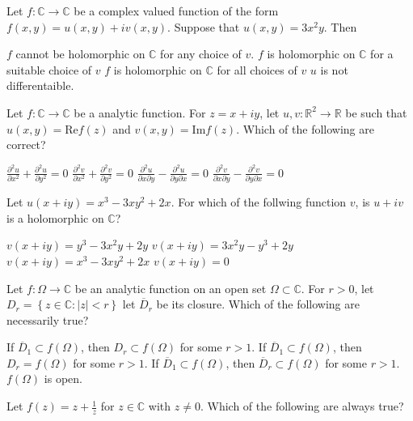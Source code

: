 \documentclass[10pt]{exam}
\newcommand{\R}{\ensuremath{\mathbb{R}}}
\newcommand{\C}{\ensuremath{\mathbb{C}}}
\newcommand{\set}[1]{\ensuremath{\left \{ {#1} \right \}}}
\newcommand{\pdd}[2]{\ensuremath{\frac{\partial^2{#1}}{\partial {#2}^2}}}
\begin{document}
\begin{questions}
\question 
Let $f:\C \rightarrow \C$ be a complex valued function of the form $f(x,y) = u(x,y) + i v(x,y)$. Suppose that $u(x,y) = 3x^2y$. Then 

\begin{choices}
\choice $f$ cannot be holomorphic on $\C$ for any choice of $v$.
\choice $f$ is holomorphic on $\C$ for a suitable choice of $v$ 
\choice $f$ is holomorphic on $\C$ for all choices of $v$ 
\choice $u$ is not differentaible.
\end{choices}

\question 
Let $f:\C \rightarrow \C$ be a analytic function. For $z = x + iy$, let $u,v:\R^2 \rightarrow \R$ be such that $u(x,y) = \mbox{Re}f(z)$ and $v(x,y) = \mbox{Im}f(z)$. Which of the following are correct?

\begin{oneparcheckboxes}
\choice $\pdd{u}{x} + \pdd{u}{y} = 0$
\choice $\pdd{v}{x} + \pdd{v}{y} = 0$
\choice $\frac{\partial^2 u}{\partial x \partial y} - \frac{\partial^2 u}{\partial y \partial x} = 0$
\choice $\frac{\partial^2 v}{\partial x \partial y} - \frac{\partial^2 v}{\partial y \partial x} = 0$
\end{oneparcheckboxes}


\question 
Let $u(x + iy) = x^3 - 3xy^2 + 2x$. For which of the follwing function $v$, is $u + iv$ is a holomorphic on $\C$?

\begin{checkboxes}
\choice $v(x + iy) = y^3 - 3x^2y + 2y$
\choice $v(x + iy) = 3x^2y - y^3 + 2y$
\choice $v(x + iy) = x^3 - 3xy^2 + 2x$
\choice $v(x + iy) = 0$
\end{checkboxes}



\question 
Let $f: \Omega \rightarrow \C$ be an analytic function on an open set $\Omega \subset \C$. For $r > 0$, let $D_r = \set{z \in \C: |z| < r}$ let $\overline{D}_r$ be its closure. Which of the following are necessarily true?

\begin{checkboxes}
\choice If $\overline{D}_1 \subset f(\Omega)$, then $D_r \subset f(\Omega)$ for some $r > 1$.
\choice If $\overline{D}_1 \subset f(\Omega)$, then $D_r =  f(\Omega)$ for some $r > 1$.
\choice If $\overline{D}_1 \subset f(\Omega)$, then $\overline{D}_r \subset f(\Omega)$ for some $r > 1$.
\choice $f(\Omega)$ is open.
\end{checkboxes}

\question 
Let $f(z) = z + \frac{1}{z}$ for $z \in \C$ with $z \neq 0$. Which of the following are always true?


\end{questions}
\end{document}
